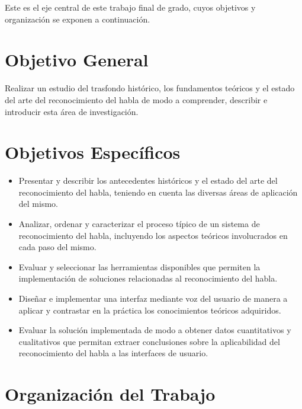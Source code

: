 Este es el eje central de este trabajo final de grado, cuyos objetivos y organizaci\'on se
exponen a continuaci\'on.

\section{Objetivo General}
\label{sec:objgral}

Realizar un estudio del trasfondo hist\'{o}rico, los fundamentos te\'{o}ricos 
y el estado del arte del reconocimiento del habla de modo a comprender, describir 
e introducir esta \'{a}rea de investigaci\'{o}n.  


\section{Objetivos Espec\'{i}ficos}
\label{sec:objspec}

\begin{itemize}
	\item Presentar y describir los antecedentes hist\'oricos y el estado del arte del reconocimiento
	del habla, teniendo en cuenta las diversas \'areas de aplicaci\'on del mismo.

    \item Analizar, ordenar y caracterizar el proceso t\'{i}pico de un sistema de reconocimiento del habla, 
        incluyendo los aspectos te\'{o}ricos involucrados en cada paso del mismo.

    \item Evaluar y seleccionar las herramientas disponibles que permiten la implementaci\'{o}n de soluciones 
        relacionadas al reconocimiento del habla.
    
    \item Dise\~{n}ar e implementar una interfaz mediante voz del usuario de manera a aplicar y 
    contrastar en la pr\'{a}ctica los conocimientos te\'{o}ricos adquiridos.
    
    \item Evaluar la soluci\'{o}n implementada de modo a obtener datos cuantitativos y cualitativos que 
        permitan extraer conclusiones sobre la aplicabilidad del reconocimiento del habla a las interfaces 
        de usuario.
\end{itemize}

\section{Organizaci\'on del Trabajo}
\label{sec:organizacion}



